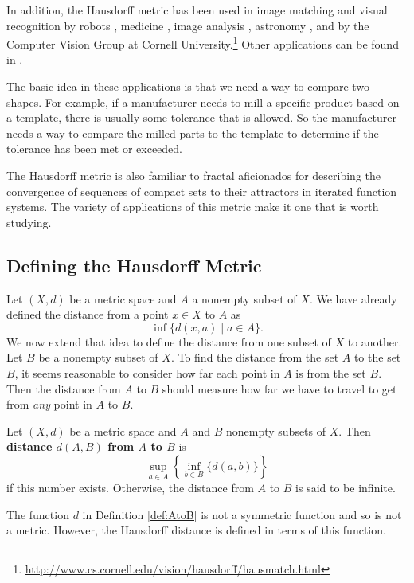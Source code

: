 In addition, the Hausdorff metric has been used in image matching and visual recognition by robots \cite{Ginchev,Goldberg}, medicine \cite{Lohmann}, image analysis \cite{Szatmari, Takacs}, astronomy \cite{Paumard}, and by the Computer Vision Group at Cornell University.\footnote{\url{http://www.cs.cornell.edu/vision/hausdorff/hausmatch.html}} Other applications can be found in \cite{Bouilott, Dougherty, Penkov}. 

The basic idea in these applications is that we need a way to compare two shapes. For example, if a manufacturer needs to mill a specific product based on a template, there is usually some tolerance that is allowed. So the manufacturer needs a way to compare the milled parts to the template to determine if the tolerance has been met or exceeded.  
 
The Hausdorff metric is also familiar to fractal aficionados for describing the convergence of sequences of compact sets to their attractors in iterated function systems. The variety of applications of this metric make it one that is worth studying. 

\subsection*{Defining the Hausdorff Metric}

Let $(X,d)$ be a metric space and $A$ a nonempty subset of $X$. We have already defined the distance from a point $x \in X$ to $A$ as 
\[\inf\{d(x,a) \mid a \in A\}.\]
We now extend that idea to define the distance from one subset of $X$ to another. Let $B$ be a nonempty subset of $X$. To find the distance from the set $A$ to the set $B$, it seems reasonable to consider how far each point in $A$ is from the set $B$. Then the distance from $A$ to $B$ should measure how far we have to travel to get from \emph{any} point in $A$ to $B$. 


\begin{definition} \label{def:AtoB} Let $(X,d)$ be a metric space and $A$ and $B$ nonempty subsets of $X$. Then \textbf{distance $d(A,B)$ from $A$ to $B$} is 
\[\sup_{a \in A} \left\{ \inf_{b \in B} \{d(a,b)\} \right\}\]
if this number exists. Otherwise, the distance from $A$ to $B$ is said to be infinite. 
\end{definition}



The function $d$ in Definition \ref{def:AtoB} is not a symmetric function and so is not a metric. However, the Hausdorff distance is defined in terms of this function.



